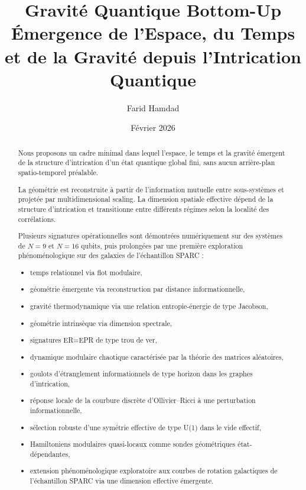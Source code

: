 \documentclass[11pt]{article}
\title{Gravité Quantique Bottom-Up\\
Émergence de l'Espace, du Temps et de la Gravité depuis l'Intrication Quantique}
\author{Farid Hamdad}
\date{Février 2026}
\begin{document}
\maketitle

\begin{abstract}

Nous proposons un cadre minimal dans lequel l'espace, le temps et la gravité émergent de la structure d'intrication d'un état quantique global fini, sans aucun arrière-plan spatio-temporel préalable.

La géométrie est reconstruite à partir de l'information mutuelle entre sous-systèmes et projetée par multidimensional scaling. La dimension spatiale effective dépend de la structure d'intrication et transitionne entre différents régimes selon la localité des corrélations.

Plusieurs signatures opérationnelles sont démontrées numériquement sur des systèmes de $N=9$ et $N=16$ qubits, puis prolongées par une première exploration phénoménologique sur des galaxies de l'échantillon SPARC :

\begin{itemize}
\item temps relationnel via flot modulaire,
\item géométrie émergente via reconstruction par distance informationnelle,
\item gravité thermodynamique via une relation entropie-énergie de type Jacobson,
\item géométrie intrinsèque via dimension spectrale,
\item signatures ER=EPR de type trou de ver,
\item dynamique modulaire chaotique caractérisée par la théorie des matrices aléatoires,
\item goulots d'étranglement informationnels de type horizon dans les graphes d'intrication,
\item réponse locale de la courbure discrète d'Ollivier--Ricci à une perturbation informationnelle,
\item sélection robuste d'une symétrie effective de type U(1) dans le vide effectif,
\item Hamiltoniens modulaires quasi-locaux comme sondes géométriques état-dépendantes,
\item extension phénoménologique exploratoire aux courbes de rotation galactiques de l'échantillon SPARC via une dimension effective émergente.
\end{itemize}


\end{abstract}
\end{document}
